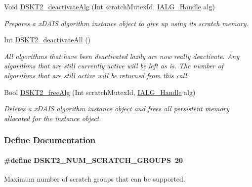 \begin{CompactItemize}
Void \hyperlink{group___d_s_p_d_s_k_t2_g74b6b6feca63328906acade37d23b597}{DSKT2\_\-deactivate\-Alg} (Int scratch\-Mutex\-Id, \hyperlink{struct_i_a_l_g___obj}{IALG\_\-Handle} alg)
\begin{CompactList}\small\item\em Prepares a x\-DAIS algorithm instance object to give up using its scratch memory. \item\end{CompactList}\item 
Int \hyperlink{group___d_s_p_d_s_k_t2_g2d252c736a3bb828d9f646cc379ac0e2}{DSKT2\_\-deactivate\-All} ()
\begin{CompactList}\small\item\em All algorithms that have been deactivated lazily are now really deactivate. Any algorithms that are still currently active will be left as is. The number of algorithms that are still active will be returned from this call. \item\end{CompactList}\item 
Bool \hyperlink{group___d_s_p_d_s_k_t2_g8dffa02b3ca1ff6856ce3cf610be7435}{DSKT2\_\-free\-Alg} (Int scratch\-Mutex\-Id, \hyperlink{struct_i_a_l_g___obj}{IALG\_\-Handle} alg)
\begin{CompactList}\small\item\em Deletes a x\-DAIS algorithm instance object and frees all persistent memory allocated for the instance object. \item\end{CompactList}\end{CompactItemize}


\subsubsection{Define Documentation}
\hypertarget{group___d_s_p_d_s_k_t2_g6ea3f0bc0c9a697930cf7d8411975ac2}{
\paragraph[DSKT2\_\-NUM\_\-SCRATCH\_\-GROUPS]{\setlength{\rightskip}{0pt plus 5cm}\#define DSKT2\_\-NUM\_\-SCRATCH\_\-GROUPS~20}\hfill}
\label{group___d_s_p_d_s_k_t2_g6ea3f0bc0c9a697930cf7d8411975ac2}


Maximum number of scratch groups that can be supported. 

